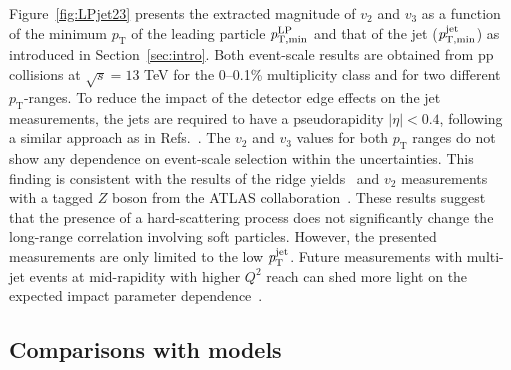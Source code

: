 Figure~\ref{fig:LPjet23} presents the extracted magnitude of $v_2$ and $v_3$ as a function of the minimum $p_\mathrm{T}$ of the leading particle $\it{p}^{\rm{LP}}_{\rm{T,min}}$ and that of the jet ($\it{p}^{\rm{jet}}_{\rm{T,min}}$) as introduced in Section~\ref{sec:intro}. 
Both event-scale results are obtained from pp collisions at $\sqrt{s}= 13$ TeV for the 0--0.1\% multiplicity class and for two different $p_\mathrm{T}$-ranges. %
To reduce the impact of the detector edge effects on the jet measurements, the jets are required to have a pseudorapidity $|\eta|<0.4$, following a similar approach as in Refs.~\cite{CDF:2001onq, ATLAS:2014riz, CMS:2015jdl}. The $v_2$ and $v_3$ values for both $p_\mathrm{T}$ ranges do not show any dependence on event-scale selection within the uncertainties. This finding is consistent with the results of the ridge yields~\cite{ALICE:2021nir} and $v_{2}$ measurements with a tagged $Z$ boson from the ATLAS collaboration~\cite{Aaboud:2019mcw}. These results suggest that the presence of a hard-scattering process does not significantly change the long-range correlation involving soft particles.
However, the presented measurements are only limited to the low $\it{p}^{\rm{jet}}_{\rm{T}}$. Future measurements with multi-jet events at mid-rapidity with higher $Q^2$ reach can shed more light on the expected impact parameter dependence~\cite{Sjostrand:1986ep,Frankfurt:2003td,Frankfurt:2010ea}.


\subsection{Comparisons with models}
\label{sec:theory}

